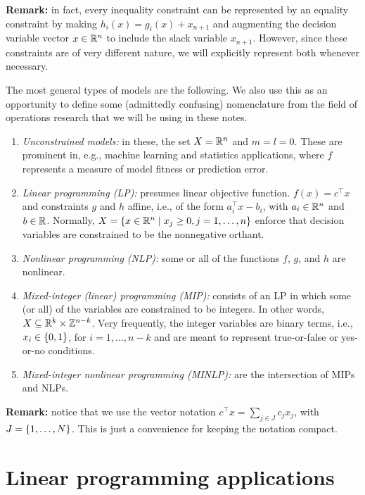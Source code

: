 {\bf Remark:} in fact, every inequality constraint can be represented by an equality constraint by making $h_i(x) = g_i(x) + x_{n+1}$ and augmenting the decision variable vector $x \in \mathbb{R}^n$ to include the slack variable $x_{n+1}$. However, since these constraints are of very different nature, we will explicitly represent both whenever necessary.

The most general types of models are the following. We also use this as an opportunity to define some (admittedly confusing) nomenclature from the field of operations research that we will be using in these notes.
%
\begin{enumerate}
    \item \emph{Unconstrained models:} in these, the set $X = \mathbb{R}^n$ and $m=l=0$. These are prominent in, e.g., machine learning and statistics applications, where $f$ represents a measure of model fitness or prediction error.  
    \item \emph{Linear programming (LP):} presumes linear objective function. $f(x) = c^\top x$ and constraints $g$ and $h$ affine, i.e., of the form $a_i^\top x - b_i$, with $a_i \in \mathbb{R}^n$ and $b \in \mathbb{R}$. Normally, $X = \left\{ x \in \mathbb{R}^n \mid x_j \geq 0, j = 1,\dots, n \right \}$ enforce that decision variables are constrained to be the nonnegative orthant.
    \item \emph{Nonlinear programming (NLP):} some or all of the functions $f$, $g$, and $h$ are nonlinear.
    \item \emph{Mixed-integer (linear) programming (MIP):} consists of an LP in which some (or all) of the variables are constrained to be integers. In other words, $X \subseteq \mathbb{R}^k \times \mathbb{Z}^{n-k}$. Very frequently, the integer variables are binary terms, i.e., $x_i \in \left\{ 0,1 \right \}$, for $i = 1,\dots, n-k$ and are meant to represent true-or-false or yes-or-no conditions.
    \item \emph{Mixed-integer nonlinear programming (MINLP):} are the intersection of MIPs and NLPs.  
\end{enumerate}

{\bf Remark:} notice that we use the vector notation $c^\top x = \sum_{j \in J} c_j x_j$, with $J = \left\{ 1,\dots,N \right \}$. This is just a convenience for keeping the notation compact. 


\section{Linear programming applications}

